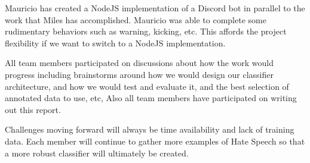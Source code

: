 \documentclass[conference]{sig-alternate-05-2015}
\begin{document}
Mauricio has created a NodeJS implementation of a Discord bot in parallel to the work that Miles has accomplished.  Mauricio was able to complete some rudimentary behaviors such as warning, kicking, etc.  This affords the project flexibility if we want to switch to a NodeJS implementation.

All team members participated on discussions about how the work would progress including brainstorms around how we would design our classifier architecture, and how we would test and evaluate it,  and the best selection of annotated data to use, etc, Also all team members have participated on writing out this report. 

Challenges moving forward will always be time availability and lack of training data.  Each member will continue to gather more examples of Hate Speech so that a more robust classifier will ultimately be created.  



\end{document}
